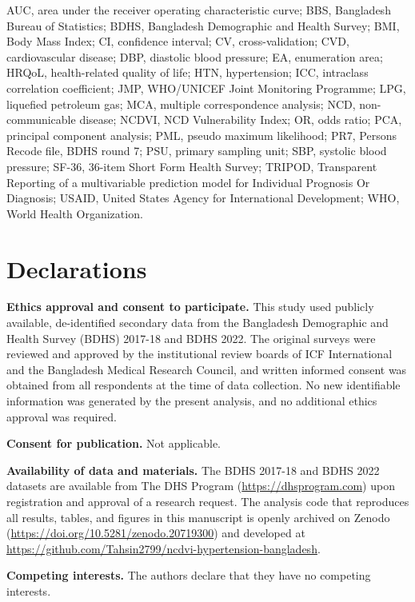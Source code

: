 \documentclass[
  12pt,
  a4paper]{article}
\begin{document}
AUC, area under the receiver operating characteristic curve; BBS, Bangladesh Bureau of Statistics; BDHS, Bangladesh Demographic and Health Survey; BMI, Body Mass Index; CI, confidence interval; CV, cross-validation; CVD, cardiovascular disease; DBP, diastolic blood pressure; EA, enumeration area; HRQoL, health-related quality of life; HTN, hypertension; ICC, intraclass correlation coefficient; JMP, WHO/UNICEF Joint Monitoring Programme; LPG, liquefied petroleum gas; MCA, multiple correspondence analysis; NCD, non-communicable disease; NCDVI, NCD Vulnerability Index; OR, odds ratio; PCA, principal component analysis; PML, pseudo maximum likelihood; PR7, Persons Recode file, BDHS round 7; PSU, primary sampling unit; SBP, systolic blood pressure; SF-36, 36-item Short Form Health Survey; TRIPOD, Transparent Reporting of a multivariable prediction model for Individual Prognosis Or Diagnosis; USAID, United States Agency for International Development; WHO, World Health Organization.

\section*{Declarations}\label{declarations}

\textbf{Ethics approval and consent to participate.} This study used publicly available, de-identified secondary data from the Bangladesh Demographic and Health Survey (BDHS) 2017-18 and BDHS 2022. The original surveys were reviewed and approved by the institutional review boards of ICF International and the Bangladesh Medical Research Council, and written informed consent was obtained from all respondents at the time of data collection. No new identifiable information was generated by the present analysis, and no additional ethics approval was required.

\textbf{Consent for publication.} Not applicable.

\textbf{Availability of data and materials.} The BDHS 2017-18 and BDHS 2022 datasets are available from The DHS Program (\url{https://dhsprogram.com}) upon registration and approval of a research request. The analysis code that reproduces all results, tables, and figures in this manuscript is openly archived on Zenodo (\url{https://doi.org/10.5281/zenodo.20719300}) and developed at \url{https://github.com/Tahsin2799/ncdvi-hypertension-bangladesh}.

\textbf{Competing interests.} The authors declare that they have no competing interests.
\end{document}
